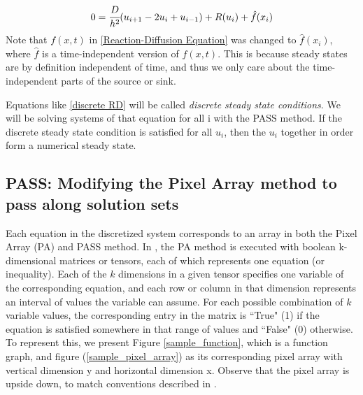 \documentclass[11pt]{article}
\begin{document}
\begin{equation}
    \label{discrete RD}
    0 = \cfrac{D}{h^2} (u_{i+1} - 2u_i + u_{i-1}) + R(u_i) + \hat{f}(x_i)
\end{equation}
Note that $f(x,t)$ in \cref{Reaction-Diffusion Equation} was changed to $\hat{f}(x_i)$, where $\hat{f}$ is a time-independent version of $f(x,t)$. This is because steady states are by definition independent of time, and thus we only care about the time-independent parts of the source or sink. 

Equations like \eqref{discrete RD} will be called \textit{discrete steady state conditions}. We will be solving systems of that equation for all i with the PASS method. If the discrete steady state condition is satisfied for all $u_i$, then the $u_i$ together in order form a numerical steady state.

\subsection{PASS: Modifying the Pixel Array method to pass along solution sets}

Each equation in the discretized system corresponds to an array in both the Pixel Array (PA) and PASS method. In \citep{Introduction_to_PA}, the PA method is executed with boolean k-dimensional matrices or tensors, each of which represents one equation (or inequality). Each of the $k$ dimensions in a given tensor specifies one variable of the corresponding equation, and each row or column in that dimension represents an interval of values the variable can assume. For each possible combination of $k$ variable values, the corresponding entry in the matrix is ``True" (1) if the equation is satisfied somewhere in that range of values and ``False" (0) otherwise. To represent this, we present Figure \cref{sample_function}, which is a function graph, and figure (\cref{sample_pixel_array}) as its corresponding pixel array with vertical dimension y and horizontal dimension x. Observe that the pixel array is upside down, to match conventions described in \citep{Introduction_to_PA}.
\end{document}
